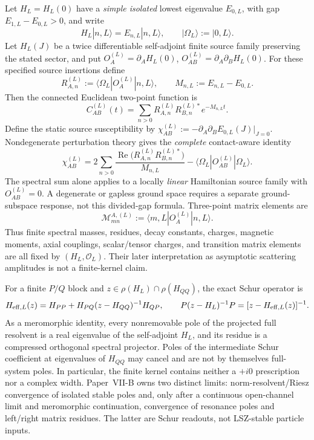 \documentclass[12pt,a4paper]{article}
\begin{document}
Let \(H_L=H_L(0)\) have a \emph{simple isolated} lowest eigenvalue \(E_{0,L}\), with gap \(E_{1,L}-E_{0,L}>0\), and write
\[
H_L|n,L\rangle=E_{n,L}|n,L\rangle,
\qquad
|\Omega_L\rangle:=|0,L\rangle .
\]
Let \(H_L(J)\) be a twice differentiable self-adjoint finite source family preserving the stated sector, and put \(O_A^{(L)}=\partial_AH_L(0)\), \(O_{AB}^{(L)}=\partial_A\partial_BH_L(0)\). For these specified source insertions define
\begin{equation}
\label{p10:eq:finite-residue-definition}
R_{A,n}^{(L)}:=\langle\Omega_L|O_A^{(L)}|n,L\rangle,
\qquad
M_{n,L}:=E_{n,L}-E_{0,L}.
\end{equation}
Then the connected Euclidean two-point function is
\begin{equation}
\label{p10:eq:finite-two-point-spectral-readout}
C_{AB}^{(L)}(t)
=
\sum_{n>0}R_{A,n}^{(L)}R_{B,n}^{(L)*}e^{-M_{n,L}t}.
\end{equation}
Define the static source susceptibility by \(\chi_{AB}^{(L)}:=-\partial_A\partial_BE_{0,L}(J)|_{J=0}\). Nondegenerate perturbation theory gives the \emph{complete} contact-aware identity
\begin{equation}
\label{p10:eq:finite-susceptibility-readout}
\chi_{AB}^{(L)}
=
2\sum_{n>0}
\frac{\operatorname{Re}\!\bigl(R_{A,n}^{(L)}R_{B,n}^{(L)*}\bigr)}{M_{n,L}}
-\langle\Omega_L|O_{AB}^{(L)}|\Omega_L\rangle.
\end{equation}
The spectral sum alone applies to a locally \emph{linear} Hamiltonian source family with \(O_{AB}^{(L)}=0\). A degenerate or gapless ground space requires a separate ground-subspace response, not this divided-gap formula.
Three-point matrix elements are
\begin{equation}
\label{p10:eq:finite-three-point-matrix-element}
\mathcal M_{mn}^{A,(L)}:=\langle m,L|O_A^{(L)}|n,L\rangle .
\end{equation}
Thus finite spectral masses, residues, decay constants, charges, magnetic
moments, axial couplings, scalar/tensor charges, and transition matrix elements
are all fixed by \((H_L,\mathcal O_L)\).  Their later interpretation as
asymptotic scattering amplitudes is not a finite-kernel claim.

For a finite \(P/Q\) block and
\(z\in\rho(H_L)\cap\rho(H_{QQ})\), the exact Schur operator is
\begin{equation}
\label{p10:eq:finite-schur-source-block}
H_{{\rm eff},L}(z)
=H_{PP}+H_{PQ}(z-H_{QQ})^{-1}H_{QP},
\qquad
P(z-H_L)^{-1}P=[z-H_{{\rm eff},L}(z)]^{-1}.
\end{equation}
As a meromorphic identity, every nonremovable pole of the projected full
resolvent is a real eigenvalue of the self-adjoint \(H_L\), and its residue is
a compressed orthogonal spectral projector.  Poles of the intermediate Schur
coefficient at eigenvalues of \(H_{QQ}\) may cancel and are not by themselves
full-system poles.  In particular,
the finite kernel contains neither a \(+i0\) prescription nor a complex width.
Paper~VII-B owns two distinct limits: norm-resolvent/Riesz convergence of isolated
stable poles and, only after a continuous open-channel limit and meromorphic
continuation, convergence of resonance poles and left/right matrix residues.
The latter are Schur readouts, not LSZ-stable particle inputs.
\end{document}
